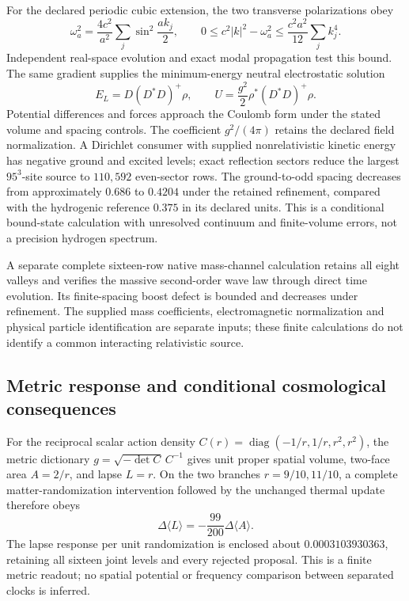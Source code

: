 For the declared periodic cubic extension, the two transverse polarizations obey
\[
 \omega_a^2=\frac{4c^2}{a^2}\sum_j\sin^2\frac{ak_j}{2},\qquad
 0\le c^2|k|^2-\omega_a^2\le\frac{c^2a^2}{12}\sum_jk_j^4.
\]
Independent real-space evolution and exact modal propagation test this bound. The same gradient supplies the minimum-energy neutral electrostatic solution
\[
 E_L=D(D^*D)^+\rho,\qquad
 U=\frac{g^2}{2}\rho^*(D^*D)^+\rho.
\]
Potential differences and forces approach the Coulomb form under the stated volume and spacing controls. The coefficient $g^2/(4\pi)$ retains the declared field normalization. A Dirichlet consumer with supplied nonrelativistic kinetic energy has negative ground and excited levels; exact reflection sectors reduce the largest $95^3$-site source to $110{,}592$ even-sector rows. The ground-to-odd spacing decreases from approximately $0.686$ to $0.4204$ under the retained refinement, compared with the hydrogenic reference $0.375$ in its declared units. This is a conditional bound-state calculation with unresolved continuum and finite-volume errors, not a precision hydrogen spectrum.

A separate complete sixteen-row native mass-channel calculation retains all eight valleys and verifies the massive second-order wave law through direct time evolution. Its finite-spacing boost defect is bounded and decreases under refinement. The supplied mass coefficients, electromagnetic normalization and physical particle identification are separate inputs; these finite calculations do not identify a common interacting relativistic source.

\subsection{Metric response and conditional cosmological consequences}

For the reciprocal scalar action density
$C(r)=\operatorname{diag}(-1/r,1/r,r^2,r^2)$, the metric dictionary
$g=\sqrt{-\det C}\,C^{-1}$ gives unit proper spatial volume, two-face area
$A=2/r$, and lapse $L=r$.  On the two branches $r=9/10,11/10$, a complete
matter-randomization intervention followed by the unchanged thermal update
therefore obeys
\[
 \Delta\langle L\rangle=-\frac{99}{200}\Delta\langle A\rangle.
\]
The lapse response per unit randomization is enclosed about
$0.0003103930363$, retaining all sixteen joint levels and every rejected
proposal.  This is a finite metric readout; no spatial potential or
frequency comparison between separated clocks is inferred.

